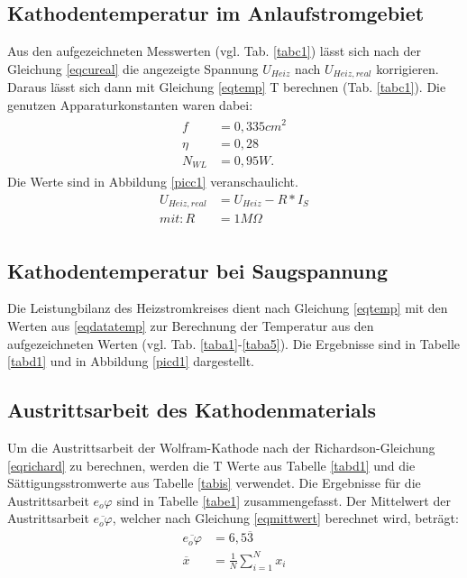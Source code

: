 \subsection{Kathodentemperatur im Anlaufstromgebiet}
Aus den aufgezeichneten Messwerten (vgl. Tab. \ref{tabc1}) lässt sich nach der Gleichung \ref{eqcureal}
die angezeigte Spannung $U_{Heiz}$ nach $U_{Heiz,real}$ korrigieren. Daraus lässt sich dann mit 
Gleichung \ref{eqtemp} T berechnen (Tab. \ref{tabc1}). Die genutzen Apparaturkonstanten waren dabei:
\begin{align}
\begin{split}
f&=0,335cm^2 \label{eqdatatemp}\\
\eta&=0,28\\
N_{WL}&=0,95W .
\end{split}
\end{align} 
Die Werte sind in Abbildung \ref{picc1} veranschaulicht.
\begin{align}
U_{Heiz,real}&=U_{Heiz}-R*I_S \label{eqcureal}\\
mit: R&=1M\Omega \\
\end{align}
 
\FloatBarrier
\subsection{Kathodentemperatur bei Saugspannung}
Die Leistungbilanz des Heizstromkreises dient nach Gleichung \ref{eqtemp} mit den Werten aus \ref{eqdatatemp}
zur Berechnung der Temperatur aus den aufgezeichneten Werten (vgl. Tab. \ref{taba1}-\ref{taba5}). Die Ergebnisse
sind in Tabelle \ref{tabd1} und in Abbildung \ref{picd1} dargestellt. 
 
\FloatBarrier
\subsection{Austrittsarbeit des Kathodenmaterials}
Um die Austrittsarbeit der Wolfram-Kathode nach der Richardson-Gleichung \ref{eqrichard} zu berechnen,
werden die T Werte aus Tabelle \ref{tabd1} und die Sättigungsstromwerte aus Tabelle \ref{tabis}
verwendet. Die Ergebnisse für die Austrittsarbeit $e_o\varphi$ sind in Tabelle \ref{tabe1} zusammengefasst.
Der Mittelwert der Austrittsarbeit $\overline{e_o\varphi}$, welcher nach Gleichung \ref{eqmittwert} berechnet
wird, beträgt:
\begin{align}
\overline{e_o\varphi}&=6{,}5\overline{3}\\
\overline{x}&=\frac{1}{N}\sum\limits_{i=1}^N x_i \label{eqmittwert}
\end{align}

\FloatBarrier

